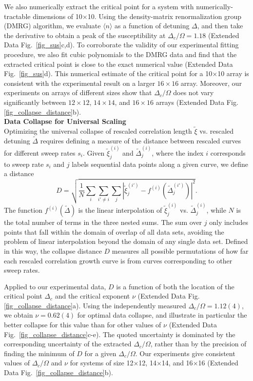 \documentclass[reprint,twocolumn,secnumarabic,amssymb, aps, prl]{revtex4-1}
\begin{document}
We also numerically extract the critical point for a system with numerically-tractable dimensions of 10$\times$10. Using the density-matrix renormalization group (DMRG) algorithm, we evaluate $\langle n \rangle$ as a function of detuning $\Delta$, and then take the derivative to obtain a peak of the susceptibility at $\Delta_c/\Omega = 1.18$ (Extended Data Fig.~\ref{fig_sus}c,d). To corroborate the validity of our experimental fitting procedure, we also fit cubic polynomials to the DMRG data and find that the extracted critical point is close to the exact numerical value (Extended Data Fig.~\ref{fig_sus}d). This numerical estimate of the critical point for a 10$\times$10 array is consistent with the experimental result on a larger $16\times 16$ array. Moreover, our experiments on arrays of different sizes show that $\Delta_c/\Omega$ does not vary significantly between $12\times 12$, $14\times 14$, and $16\times 16$ arrays (Extended Data Fig. \ref{fig_collapse_distance}b).\\

\noindent\textbf{Data Collapse for Universal Scaling}\\
Optimizing the universal collapse of rescaled correlation length $\tilde{\xi}$ vs. rescaled detuning $\tilde{\Delta}$ requires defining a measure of the distance between rescaled curves for different sweep rates $s_i$. Given $\tilde{\xi}^{(i)}_j$ and $\tilde{\Delta}^{(i)}_j$, where the index $i$ corresponds to sweep rate $s_i$ and $j$ labels sequential data points along a given curve, we define a distance \cite{Seno2001}
\begin{equation}
D = \sqrt{\frac{1}{N}\sum_i \sum_{i'\neq i} \sum_j \left \lvert\tilde{\xi}^{(i')}_j - f^{(i)}\left(\tilde{\Delta}^{(i')}_j\right)\right \rvert^2}.
\end{equation}
The function $f^{(i)}(\tilde{\Delta})$ is the linear interpolation of $\tilde{\xi}^{(i)}_j$ vs. $\tilde{\Delta}^{(i)}_j$, while $N$ is the total number of terms in the three nested sums. The sum over $j$ only includes points that fall within the domain of overlap of all data sets, avoiding the problem of linear interpolation beyond the domain of any single data set. Defined in this way, the collapse distance $D$ measures all possible permutations of how far each rescaled correlation growth curve is from curves corresponding to other sweep rates.

Applied to our experimental data, $D$ is a function of both the location of the critical point $\Delta_c$ and the critical exponent $\nu$ (Extended Data Fig. \ref{fig_collapse_distance}a). Using the independently measured $\Delta_c/\Omega = 1.12(4)$, we obtain $\nu = 0.62(4)$ for optimal data collapse, and illustrate in particular the better collapse for this value than for other values of $\nu$ (Extended Data Fig.~\ref{fig_collapse_distance}c-e). The quoted uncertainty is dominated by the corresponding uncertainty of the extracted $\Delta_c/\Omega$, rather than by the precision of finding the minimum of $D$ for a given $\Delta_c/\Omega$. Our experiments give consistent values of $\Delta_c/\Omega$ and $\nu$ for systems of size 12$\times$12, 14$\times$14, and 16$\times$16 (Extended Data Fig.~\ref{fig_collapse_distance}b).\\
\end{document}
